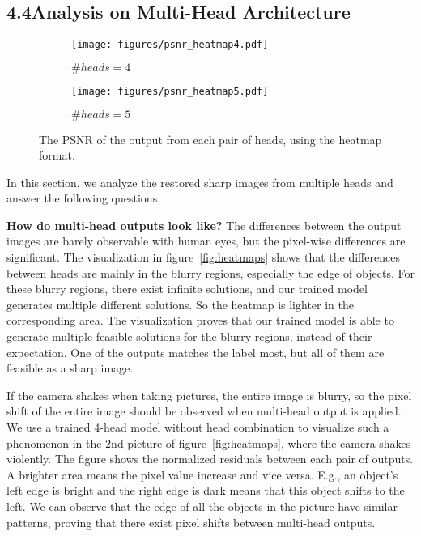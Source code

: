 \documentclass[letterpaper]{article} \usepackage{aaai23}  \usepackage{times}  \usepackage{helvet}  \usepackage{courier}  \usepackage[hyphens]{url}  \usepackage{graphicx} \urlstyle{rm} \def\UrlFont{\rm}  \usepackage{natbib}  \usepackage{caption} \frenchspacing  \setlength{\pdfpagewidth}{8.5in} \setlength{\pdfpageheight}{11in} \usepackage{algorithm}
\begin{document}
\subsection{4.4\quad Analysis on Multi-Head Architecture}

\begin{figure}[t]
     \centering
     \begin{subfigure}[b]{0.8\columnwidth}
         \centering
         \texttt{[image: figures/psnr\_heatmap4.pdf]}
         \caption{$\#heads=4$}
         \label{fig:psnr_heatmap4}
     \end{subfigure}
\begin{subfigure}[b]{0.8\columnwidth}
         \centering
         \texttt{[image: figures/psnr\_heatmap5.pdf]}
         \caption{$\#heads=5$}
         \label{fig:psnr_heatmap5}
     \end{subfigure}
\caption{The PSNR of the output from each pair of heads, using the heatmap format.}
        \label{fig:psnr_heatmap}
\end{figure}


In this section, we analyze the restored sharp images from multiple heads and answer the following questions. 

\textbf{How do multi-head outputs look like?} The differences between the output images are barely observable with human eyes, but the pixel-wise differences are significant. The visualization in figure~\ref{fig:heatmaps} shows that the differences between heads are mainly in the blurry regions, especially the edge of objects. For these blurry regions, there exist infinite solutions, and our trained model generates multiple different solutions. So the heatmap is lighter in the corresponding area. The visualization proves that our trained model is able to generate multiple feasible solutions for the blurry regions, instead of their expectation. One of the outputs matches the label most, but all of them are feasible as a sharp image.

If the camera shakes when taking pictures, the entire image is blurry, so the pixel shift of the entire image should be observed when multi-head output is applied. We use a trained 4-head model without head combination to visualize such a phenomenon in the 2nd picture of figure~\ref{fig:heatmaps}, where the camera shakes violently. The figure shows the normalized residuals between each pair of outputs. A brighter area means the pixel value increase and vice versa. E.g., an object's left edge is bright and the right edge is dark means that this object shifts to the left. We can observe that the edge of all the objects in the picture have similar patterns, proving that there exist pixel shifts between multi-head outputs.
\end{document}
